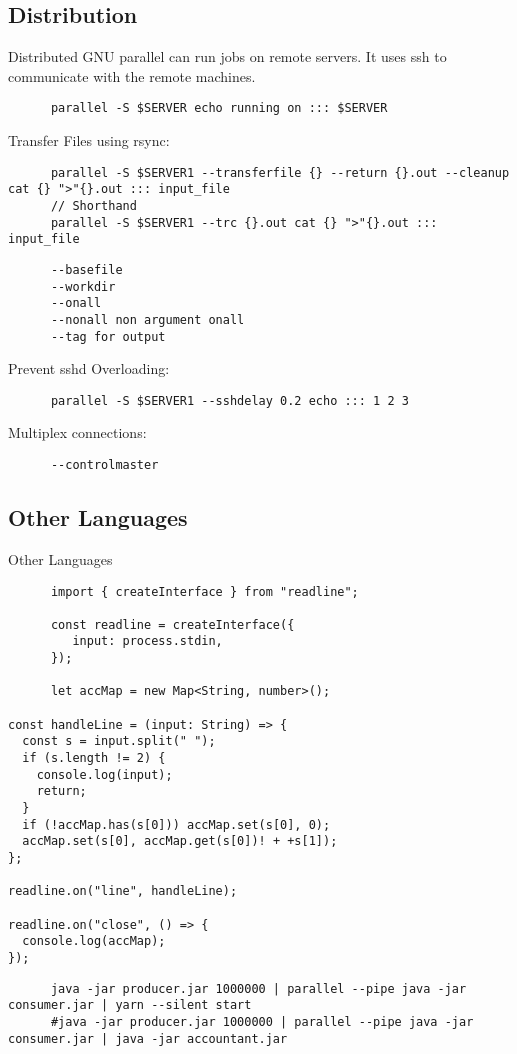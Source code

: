 \subsection{Distribution}
\begin{frame}[fragile]{Distributed}
   GNU parallel can run jobs on remote servers. It uses ssh to communicate with the remote machines.\\
   \begin{verbatim}
      parallel -S $SERVER echo running on ::: $SERVER
   \end{verbatim}
   Transfer Files using rsync:
   \begin{verbatim}
      parallel -S $SERVER1 --transferfile {} --return {}.out --cleanup cat {} ">"{}.out ::: input_file
      // Shorthand
      parallel -S $SERVER1 --trc {}.out cat {} ">"{}.out ::: input_file
   \end{verbatim}
   \begin{verbatim}
      --basefile
      --workdir
      --onall
      --nonall non argument onall
      --tag for output
   \end{verbatim}
   Prevent sshd Overloading:
   \begin{verbatim}
      parallel -S $SERVER1 --sshdelay 0.2 echo ::: 1 2 3
   \end{verbatim}
   Multiplex connections:
   \begin{verbatim}
      --controlmaster
   \end{verbatim}


\end{frame}
\subsection{Other Languages}
\begin{frame}[fragile]{Other Languages}
   \begin{verbatim}
      import { createInterface } from "readline";

      const readline = createInterface({
         input: process.stdin,
      });

      let accMap = new Map<String, number>();

const handleLine = (input: String) => {
  const s = input.split(" ");
  if (s.length != 2) {
    console.log(input);
    return;
  }
  if (!accMap.has(s[0])) accMap.set(s[0], 0);
  accMap.set(s[0], accMap.get(s[0])! + +s[1]);
};

readline.on("line", handleLine);

readline.on("close", () => {
  console.log(accMap);
});
   \end{verbatim}
   \begin{verbatim}
      java -jar producer.jar 1000000 | parallel --pipe java -jar consumer.jar | yarn --silent start
      #java -jar producer.jar 1000000 | parallel --pipe java -jar consumer.jar | java -jar accountant.jar
   \end{verbatim}
\end{frame}
